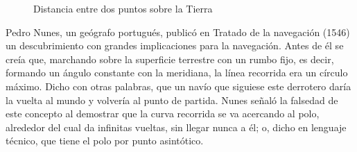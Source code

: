 \begin{figure}[!h]
	\caption{Distancia entre dos puntos sobre la Tierra}
\end{figure}

Pedro Nunes, un geógrafo portugués, publicó en Tratado de la navegación (1546) un descubrimiento con grandes implicaciones para la navegación. Antes de él se creía que, marchando sobre la superficie terrestre con un rumbo fijo, es decir, formando un ángulo constante con la meridiana, la línea recorrida era un círculo máximo. Dicho con otras palabras, que un navío que siguiese este derrotero daría la vuelta al mundo y volvería al punto de partida. Nunes señaló la falsedad de este concepto al demostrar que la curva recorrida se va acercando al polo, alrededor del cual da infinitas vueltas, sin llegar nunca a él; o, dicho en lenguaje técnico, que tiene el polo por punto asintótico.


